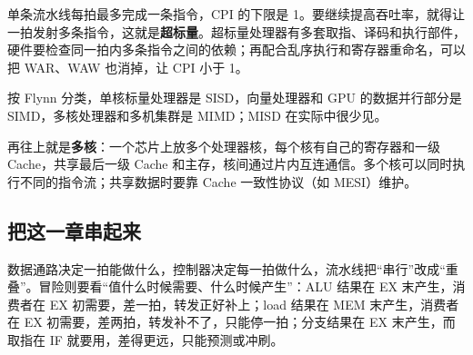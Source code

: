 单条流水线每拍最多完成一条指令，CPI 的下限是 1。要继续提高吞吐率，就得让一拍发射多条指令，这就是\textbf{超标量}。超标量处理器有多套取指、译码和执行部件，硬件要检查同一拍内多条指令之间的依赖；再配合乱序执行和寄存器重命名，可以把 WAR、WAW 也消掉，让 CPI 小于 1。

按 Flynn 分类，单核标量处理器是 SISD，向量处理器和 GPU 的数据并行部分是 SIMD，多核处理器和多机集群是 MIMD；MISD 在实际中很少见。

再往上就是\textbf{多核}：一个芯片上放多个处理器核，每个核有自己的寄存器和一级 Cache，共享最后一级 Cache 和主存，核间通过片内互连通信。多个核可以同时执行不同的指令流；共享数据时要靠 Cache 一致性协议（如 MESI）维护。

\subsection{把这一章串起来}

数据通路决定一拍能做什么，控制器决定每一拍做什么，流水线把“串行”改成“重叠”。冒险则要看“值什么时候需要、什么时候产生”：ALU 结果在 EX 末产生，消费者在 EX 初需要，差一拍，转发正好补上；load 结果在 MEM 末产生，消费者在 EX 初需要，差两拍，转发补不了，只能停一拍；分支结果在 EX 末产生，而取指在 IF 就要用，差得更远，只能预测或冲刷。

\newpage


